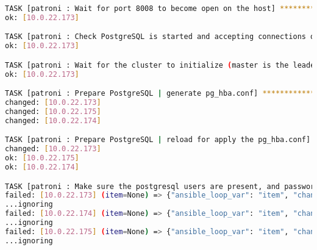 \begin{flushleft}
\begin{lstlisting}[language=bash, caption=Deploy - Anhang - Deployt,captionpos=b,label={lst:deploy-appendix-deployt},breaklines=true]
TASK [patroni : Wait for port 8008 to become open on the host] ****************************************************************************************************************************************************
ok: [10.0.22.173]

TASK [patroni : Check PostgreSQL is started and accepting connections on Master] **********************************************************************************************************************************
ok: [10.0.22.173]

TASK [patroni : Wait for the cluster to initialize (master is the leader with the lock)] **************************************************************************************************************************
ok: [10.0.22.173]

TASK [patroni : Prepare PostgreSQL | generate pg_hba.conf] ********************************************************************************************************************************************************
changed: [10.0.22.173]
changed: [10.0.22.175]
changed: [10.0.22.174]

TASK [patroni : Prepare PostgreSQL | reload for apply the pg_hba.conf] ********************************************************************************************************************************************
changed: [10.0.22.173]
ok: [10.0.22.175]
ok: [10.0.22.174]

TASK [patroni : Make sure the postgresql users are present, and password does not differ from the specified] ******************************************************************************************************
failed: [10.0.22.173] (item=None) => {"ansible_loop_var": "item", "changed": false, "false_condition": "patroni_cluster_bootstrap_method != \"initdb\" and (pgbackrest_install|bool or wal_g_install|bool) and (existing_pgcluster is not defined or not existing_pgcluster|bool)", "item": null, "msg": "Failed to template loop_control.label: 'None' has no attribute 'name'. 'None' has no attribute 'name'", "skip_reason": "Conditional result was False"}
...ignoring
failed: [10.0.22.174] (item=None) => {"ansible_loop_var": "item", "changed": false, "false_condition": "patroni_cluster_bootstrap_method != \"initdb\" and (pgbackrest_install|bool or wal_g_install|bool) and (existing_pgcluster is not defined or not existing_pgcluster|bool)", "item": null, "msg": "Failed to template loop_control.label: 'None' has no attribute 'name'. 'None' has no attribute 'name'", "skip_reason": "Conditional result was False"}
...ignoring
failed: [10.0.22.175] (item=None) => {"ansible_loop_var": "item", "changed": false, "false_condition": "patroni_cluster_bootstrap_method != \"initdb\" and (pgbackrest_install|bool or wal_g_install|bool) and (existing_pgcluster is not defined or not existing_pgcluster|bool)", "item": null, "msg": "Failed to template loop_control.label: 'None' has no attribute 'name'. 'None' has no attribute 'name'", "skip_reason": "Conditional result was False"}
...ignoring


\end{lstlisting}
\end{flushleft}
